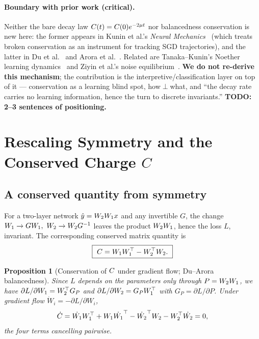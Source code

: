\documentclass[11pt]{article}
\newtheorem{Proposition}[Theorem]{Proposition}
\begin{document}
\paragraph{Boundary with prior work (critical).}
Neither the bare decay law $C(t)=C(0)e^{-2\mu t}$ nor balancedness conservation is new here:
the former appears in Kunin et al.'s \emph{Neural Mechanics}~\citep{kunin2021neural} (which treats
broken conservation as an instrument for tracking SGD trajectories), and the latter in
Du et al.~\citep{du2018algorithmic} and Arora et al.~\citep{arora2018optimization}. Related are
Tanaka--Kunin's Noether learning dynamics~\citep{tanaka2021noether} and Ziyin et al.'s noise
equilibrium~\citep{ziyin2024parameter}. \textbf{We do not re-derive this mechanism}; the contribution
is the interpretive/classification layer on top of it --- conservation as a learning blind spot,
how$\perp$what, and ``the decay rate carries no learning information, hence the turn to discrete
invariants.'' \textbf{TODO: 2--3 sentences of positioning.}

\section{Rescaling Symmetry and the Conserved Charge \texorpdfstring{$C$}{C}}\label{sec:setup}

\subsection{A conserved quantity from symmetry}\label{sec:setup:charge}
For a two-layer network $\hat y = W_2W_1 x$ and any invertible $G$, the change
$W_1 \to GW_1,\ W_2 \to W_2 G^{-1}$ leaves the product $W_2W_1$, hence the loss $L$,
invariant. The corresponding conserved matrix quantity is
\begin{equation}\label{eq:Cdef}
  \boxed{\ C = W_1W_1^\top - W_2^\top W_2.\ }
\end{equation}

\begin{Proposition}[Conservation of $C$ under gradient flow; Du--Arora balancedness]\label{prop:conserved}
Since $L$ depends on the parameters only through $P=W_2W_1$, we have
$\partial L/\partial W_1 = W_2^\top G_P$ and $\partial L/\partial W_2 = G_PW_1^\top$ with
$G_P=\partial L/\partial P$. Under gradient flow $\dot W_i = -\partial L/\partial W_i$,
\[
  \dot{C} = \dot{W_1}W_1^\top + W_1\dot{W_1}^\top
            - \dot{W_2}^\top W_2 - W_2^\top\dot{W_2} = 0,
\]
the four terms cancelling pairwise.
\end{Proposition}
\end{document}
